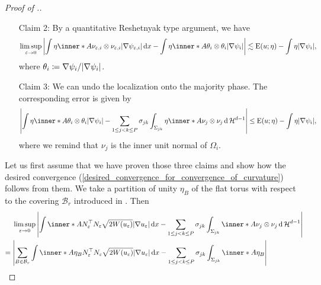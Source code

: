 \begin{proof}[Proof of .]
\begin{itemize}[wide=0pt]
		\item[Claim 2:]
		By a quantitative Reshetnyak type argument, we have
		\begin{equation*}
			\limsup_{ \varepsilon \to 0 }
			\abs{
				\int
				\eta \inner*{ A }{ \nu_{ \varepsilon, i } \otimes \nu_{ 
						\varepsilon,  i } }
				\abs{ \nabla \psi_{ \varepsilon,  i } }
				\dd{ x }
				-
				\int
				\eta \inner*{ A }{ \theta_{ i }  \otimes 
					\theta_{ i } }
				\abs{ \nabla \psi_{ i } }
			}
			\lesssim
			\energy ( u ; \eta ) - \int \eta \abs{ \nabla \psi_{ i } },
		\end{equation*}
		where $ \theta_{ i } \coloneqq \nabla \psi_{ i } / \abs{ \nabla \psi_{ 
				i } } $.
		\item[Claim 3:] 
		We can undo the localization onto the majority phase. The corresponding 
		error is given by
		\begin{equation*}
			\abs{ 
				\int
				\eta
				\inner*{ A }{ \theta_{ i } \otimes \theta_{ i } }
				\abs{ \nabla \psi_{ i } }
				-
				\sum_{ 1 \leq j < k \leq P }
				\sigma_{ j k }
				\int_{ \Sigma_{ j k } }
				\eta 
				\inner*{ A }{ \nu_{ j } \otimes \nu_{ j } }
				\dd{ \hm^{ d - 1 } }
			}
			\leq
			\energy ( u ; \eta ) - \int \eta \abs{ \nabla \psi_{ i } },
		\end{equation*}
		where we remind that $ \nu_{ j } $ is the inner unit normal of $ 
		\Omega_{ i } $.
	\end{itemize}
	Let us first assume that we have proven those three claims and show how the 
	desired convergence 
	(\ref{desired_convergence_for_convergence_of_curvature}) follows from them. 
	We take a partition of unity $ \eta_{ B } $ of the flat torus with respect 
	to the covering $ \mathcal{ B }_{ r } $ introduced in 
	. Then
	\begin{align*}
		& \limsup_{ \varepsilon \to 0 }
		\abs{
			\int
			\inner*{ A }{ N_{ \varepsilon }^{ \top } N_{ \varepsilon } }
			\sqrt{ 2 W ( u_{ \varepsilon } ) }
			\abs{ \nabla u_{ \varepsilon } }
			\dd{ x }
			-
			\sum_{ 1 \leq j < k \leq P }
			\sigma_{ j  k }
			\int_{ \Sigma_{ j k } }
			\inner*{ A }{ \nu_{ j } \otimes \nu_{ j } }
			\dd{ \hm^{ d - 1 } }
		} 
		\\
		={} &
		\abs{ 
			\sum_{ B \in \mathcal{ B }_{ r } }
			\int
			\inner*{ A \eta_{ B } }
			{ N_{ \varepsilon }^{ \top } N_{ \varepsilon } }
			\sqrt{ 2 W ( u_{ \varepsilon } ) } \abs{ \nabla u_{ \varepsilon } }
			\dd{ x }
			-
			\sum_{ 1 \leq j < k \leq P }
			\sigma_{ j k }
			\int_{ \Sigma_{ j k } }
			\inner*{ A \eta_{ B } }
}
\end{align*}
\end{proof}
